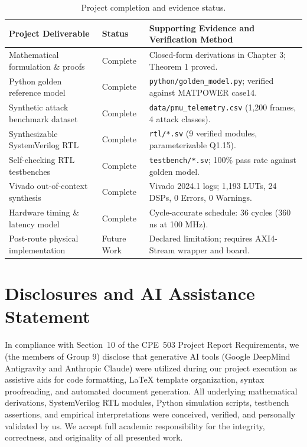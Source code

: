\documentclass[11pt,a4paper]{report}
\begin{document}
\begin{table}[H]
\centering
\caption{Project completion and evidence status.}
\label{tab:project_status}
\small
\renewcommand{\arraystretch}{1.2}
\begin{tabular}{|p{4.2cm}|p{2.2cm}|p{8.0cm}|}
\hline
\textbf{Project Deliverable} & \textbf{Status} & \textbf{Supporting Evidence and Verification Method} \\
\hline
Mathematical formulation \& proofs & Complete & Closed-form derivations in Chapter 3; Theorem 1 proved. \\
\hline
Python golden reference model & Complete & \texttt{python/golden\_model.py}; verified against MATPOWER case14. \\
\hline
Synthetic attack benchmark dataset & Complete & \texttt{data/pmu\_telemetry.csv} (1,200 frames, 4 attack classes). \\
\hline
Synthesizable SystemVerilog RTL & Complete & \texttt{rtl/*.sv} (9 verified modules, parameterizable Q1.15). \\
\hline
Self-checking RTL testbenches & Complete & \texttt{testbench/*.sv}; 100\% pass rate against golden model. \\
\hline
Vivado out-of-context synthesis & Complete & Vivado 2024.1 logs; 1,193 LUTs, 24 DSPs, 0 Errors, 0 Warnings. \\
\hline
Hardware timing \& latency model & Complete & Cycle-accurate schedule: 36 cycles (360 ns at 100 MHz). \\
\hline
Post-route physical implementation & Future Work & Declared limitation; requires AXI4-Stream wrapper and board. \\
\hline
\end{tabular}
\end{table}

\chapter*{Disclosures and AI Assistance Statement}
In compliance with Section~10 of the CPE~503 Project Report Requirements, we (the members of Group 9)
disclose that generative AI tools (Google DeepMind Antigravity and Anthropic Claude) were
utilized during our project execution as assistive aids for code formatting, LaTeX template
organization, syntax proofreading, and automated document generation. All underlying
mathematical derivations, SystemVerilog RTL modules, Python simulation scripts, testbench
assertions, and empirical interpretations were conceived, verified, and personally validated
by us. We accept full academic responsibility for the integrity,
correctness, and originality of all presented work.
\end{document}
